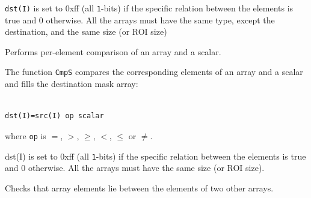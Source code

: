 \texttt{dst(I)} is set to 0xff (all \texttt{1}-bits) if the specific relation between the elements is true and 0 otherwise. All the arrays must have the same type, except the destination, and the same size (or ROI size)

\label{CmpS}

Performs per-element comparison of an array and a scalar.


\begin{description}
\end{description}

The function \texttt{CmpS} compares the corresponding elements of an array and a scalar and fills the destination mask array:

\begin{lstlisting}

dst(I)=src(I) op scalar

\end{lstlisting}

where \texttt{op} is $=$, $>$, $\ge$, $<$, $\le$ or $\ne$.

dst(I) is set to 0xff (all \texttt{1}-bits) if the specific relation between the elements is true and 0 otherwise. All the arrays must have the same size (or ROI size).

\label{InRange}

Checks that array elements lie between the elements of two other arrays.


